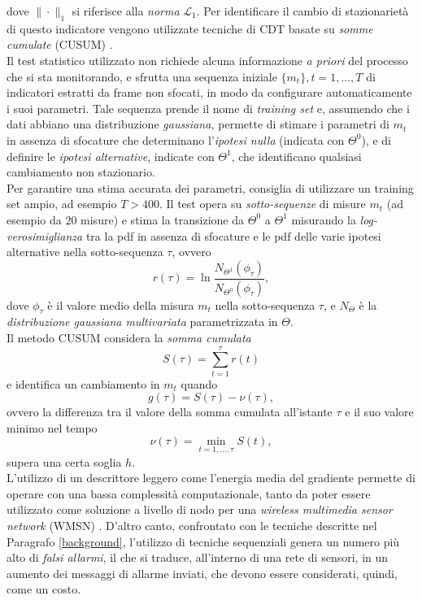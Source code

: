 dove $\| \cdot \|_1$ si riferisce alla \textit{norma} $\mathcal{L}_1$. 
Per identificare il cambio di stazionariet\`a di questo indicatore vengono utilizzate tecniche di CDT basate su \textit{somme cumulate} (CUSUM) \cite{alippi2008just}.\\
Il test statistico utilizzato non richiede alcuna informazione \textit{a priori} del processo che si sta monitorando, e sfrutta una sequenza iniziale $\{m_t\}, t=1,\dots,T$ di indicatori estratti da frame non sfocati, in modo da configurare automaticamente i suoi parametri. 
Tale sequenza prende il nome di \textit{training set} e, assumendo che i dati abbiano una distribuzione \textit{gaussiana,} permette di stimare i parametri di $m_t$ in assenza di sfocature che determinano l'\textit{ipotesi nulla} (indicata con $\Theta^0$), e di definire le \textit{ipotesi alternative}, indicate con $\Theta^1$, che identificano qualsiasi cambiamento non stazionario.\\
Per garantire una stima accurata dei parametri, \cite{alippi2010detecting} consiglia di utilizzare un training set ampio, ad esempio $T > 400$.
Il test opera su \textit{sotto-sequenze} di misure $m_t$ (ad esempio da $20$ misure) e stima la transizione da $\Theta^0$ a $\Theta^1$ misurando la \textit{log-verosimiglianza} tra la pdf in assenza di sfocature e le pdf delle varie ipotesi alternative nella sotto-sequenza $\tau$, ovvero
\[ r(\tau) = \ln \frac{N_{\Theta^1}(\phi_{\tau})}{N_{\Theta^0}(\phi_{\tau})}, \]
dove $\phi_{\tau}$ \`e il valore medio della misura $m_t$ nella sotto-sequenza $\tau$, e $N_{\Theta}$ \`e la \textit{distribuzione gaussiana multivariata} parametrizzata in $\Theta$.\\
Il metodo CUSUM considera la \textit{somma cumulata} 
\[ S(\tau) = \sum^\tau_{t=1} r(t) \]
e identifica un cambiamento in $m_t$ quando \[g(\tau)=S(\tau)-\nu(\tau),\] ovvero la differenza tra il valore della somma cumulata all'istante $\tau$ e il suo valore minimo nel tempo \[\nu(\tau)=\min_{t=1,...,\tau}S(t),\] supera una certa soglia $h$.\\
L'utilizzo di un descrittore leggero come l'energia media del gradiente permette di operare con una bassa complessit\`a computazionale, tanto da poter essere utilizzato come soluzione a livello di nodo per una \textit{wireless multimedia sensor network} (WMSN) \cite{akyildiz2007survey}.
D'altro canto, confrontato con le tecniche descritte nel Paragrafo \ref{background}, l'utilizzo di tecniche sequenziali genera un numero pi\`u alto di \textit{falsi allarmi}, il che si traduce, all'interno di una rete di sensori, in un aumento dei messaggi di allarme inviati, che devono essere considerati, quindi, come un costo.












